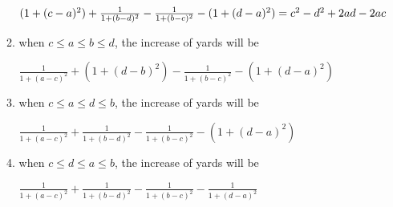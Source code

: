 \documentclass{article}
\begin{document}
\begin{enumerate}
\begin{enumerate}
                $(1+(c-a)^2) + \frac{1}{1+(b-d)^2} - \frac{1}{1+(b-c)^2} - (1+(d-a)^2)\\
                =c^2-d^2+2ad-2ac
                $
            \item when $c \leq a \leq b \leq d$, the increase of yards will be

                $\frac{1}{1+(a-c)^2}+(1+(d-b)^2)-\frac{1}{1+(b-c)^2}-(1+(d-a)^2)
                $
            \item when $c \leq a \leq d \leq b$, the increase of yards will be

            $
                \frac{1}{1+(a-c)^2}+\frac{1}{1+(b-d)^2}-\frac{1}{1+(b-c)^2}-(1+(d-a)^2)
                $
           \item when $c \leq d \leq a \leq b$, the increase of yards will be

                $
                \frac{1}{1+(a-c)^2}+\frac{1}{1+(b-d)^2}-\frac{1}{1+(b-c)^2}-\frac{1}{1+(d-a)^2}
                $
        \end{enumerate}
        
    \end{enumerate}
\end{document}
